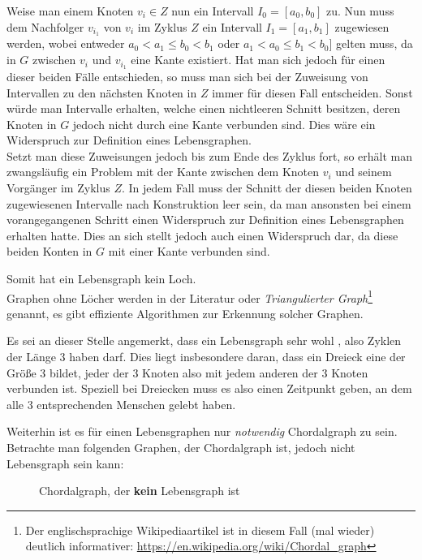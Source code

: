 Weise man einem Knoten $v_i \in Z$ nun ein Intervall $I_0 = [a_0,b_0]$ zu. 
Nun muss dem Nachfolger $v_{i_1}$ von $v_i$ im Zyklus $Z$ ein Intervall $I_1 = [a_1,b_1]$ zugewiesen werden, wobei entweder $a_0 < a_1 \leq b_0 < b_1$ oder $a_1 < a_0 \leq b_1 < b_0]$ gelten muss, da in $G$ zwischen $v_i$ und $v_{i_1}$ eine Kante existiert. Hat man sich jedoch für einen dieser beiden Fälle entschieden, so muss man sich bei der Zuweisung von Intervallen zu den nächsten Knoten in $Z$ immer für diesen Fall entscheiden. Sonst würde man Intervalle erhalten, welche einen nichtleeren Schnitt besitzen, deren Knoten in $G$ jedoch nicht durch eine Kante verbunden sind. Dies wäre ein Widerspruch zur Definition eines Lebensgraphen.\\
Setzt man diese Zuweisungen jedoch bis zum Ende des Zyklus fort, so erhält man zwangsläufig ein Problem mit der Kante zwischen dem Knoten $v_i$ und seinem Vorgänger im Zyklus $Z$. In jedem Fall muss der Schnitt der diesen beiden Knoten zugewiesenen Intervalle nach Konstruktion leer sein, da man ansonsten bei einem vorangegangenen Schritt einen Widerspruch zur Definition eines Lebensgraphen erhalten hatte. Dies an sich stellt jedoch auch einen Widerspruch dar, da diese beiden Konten in $G$ mit einer Kante verbunden sind.

Somit hat ein Lebensgraph kein Loch. \\
Graphen ohne Löcher werden in der Literatur  oder \emph{Triangulierter Graph}\footnote{Der englischsprachige Wikipediaartikel ist in diesem Fall (mal wieder) deutlich informativer: \url{https://en.wikipedia.org/wiki/Chordal_graph}} genannt, es gibt effiziente Algorithmen zur Erkennung solcher Graphen.

Es sei an dieser Stelle angemerkt, dass ein Lebensgraph sehr wohl , also Zyklen der Länge 3 haben darf. Dies liegt insbesondere daran, dass ein Dreieck eine  der Größe 3 bildet, jeder der 3 Knoten also mit jedem anderen der 3 Knoten verbunden ist. Speziell bei Dreiecken muss es also einen Zeitpunkt geben, an dem alle 3 entsprechenden Menschen gelebt haben.

Weiterhin ist es für einen Lebensgraphen nur \emph{notwendig} Chordalgraph zu sein. Betrachte man folgenden Graphen, der Chordalgraph ist, jedoch nicht Lebensgraph sein kann:

\begin{center}
\begin{figure}[h]
\caption{Chordalgraph, der \textbf{kein} Lebensgraph ist}
\end{figure}
\end{center}

